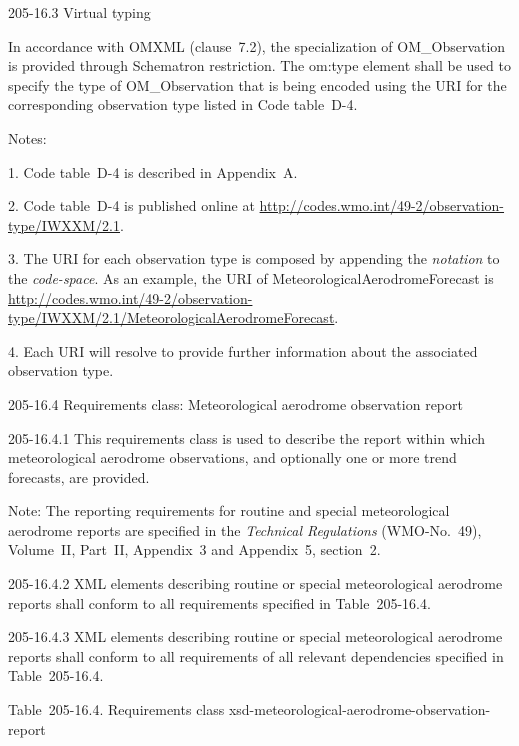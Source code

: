 205-16.3 Virtual typing

In accordance with OMXML (clause~7.2), the specialization of OM\_Observation is provided through Schematron restriction. The om:type element shall be used to specify the type of OM\_Observation that is being encoded using the URI for the corresponding observation type listed in Code table~D-4.

Notes:

1. Code table~D-4 is described in Appendix~A.

2. Code table~D-4 is published online at \url{http://codes.wmo.int/49-2/observation-type/IWXXM/2.1}.

3. The URI for each observation type is composed by appending the \emph{notation} to the \emph{code-space}. As an example, the URI of MeteorologicalAerodromeForecast is \url{http://codes.wmo.int/49-2/observation-type/IWXXM/2.1/MeteorologicalAerodromeForecast}.

4. Each URI will resolve to provide further information about the associated observation type.

205-16.4 Requirements class: Meteorological aerodrome observation report

205-16.4.1 This requirements class is used to describe the report within which meteorological aerodrome observations, and optionally one or more trend forecasts, are provided.

Note: The reporting requirements for routine and special meteorological aerodrome reports are specified in the \emph{Technical Regulations} (WMO-No.~49), Volume~II, Part~II, Appendix~3 and Appendix~5, section~2.

205-16.4.2 XML elements describing routine or special meteorological aerodrome reports shall conform to all requirements specified in Table~205-16.4.

205-16.4.3 XML elements describing routine or special meteorological aerodrome reports shall conform to all requirements of all relevant dependencies specified in Table~205-16.4.

Table~205-16.4. Requirements class xsd-meteorological-aerodrome-observation-report


